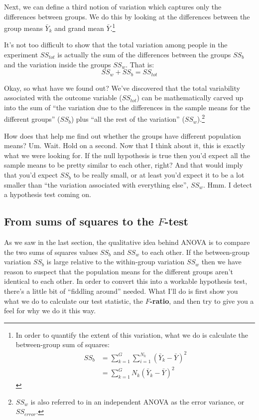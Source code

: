 \documentclass[
  a4paper,
]{book}
\begin{document}
Next, we can define a third notion of variation which captures only the
differences between groups. We do this by looking at the differences
between the group means \(\bar{Y}_k\) and grand mean
\(\bar{Y}\).\footnote{In order to quantify the extent of this variation,
  what we do is calculate the between-group sum of squares:
  \[\begin{aligned} SS_{b} &= \sum_{k=1}^{G} \sum_{i=1}^{N_k} ( \bar{Y}_{k} - \bar{Y} )^2 \\ &= \sum_{k=1}^{G} N_k ( \bar{Y}_{k} - \bar{Y} )^2 \end{aligned}\]}

It's not too difficult to show that the total variation among people in
the experiment \(SS_{tot}\) is actually the sum of the differences
between the groups \(SS_b\) and the variation inside the groups
\(SS_w\). That is: \[SS_w+SS_b=SS_{tot}\]

Okay, so what have we found out? We've discovered that the total
variability associated with the outcome variable (\(SS_{tot}\)) can be
mathematically carved up into the sum of ``the variation due to the
differences in the sample means for the different groups'' (\(SS_b\))
plus ``all the rest of the variation'' (\(SS_w\)).\footnote{\(SS_w\) is
  also referred to in an independent ANOVA as the error variance, or
  \(SS_{error}\).}

How does that help me find out whether the groups have different
population means? Um. Wait. Hold on a second. Now that I think about it,
this is exactly what we were looking for. If the null hypothesis is true
then you'd expect all the sample means to be pretty similar to each
other, right? And that would imply that you'd expect \(SS_b\) to be
really small, or at least you'd expect it to be a lot smaller than ``the
variation associated with everything else'', \(SS_w\). Hmm. I detect a
hypothesis test coming on.

\hypertarget{from-sums-of-squares-to-the-f-test}{%
\subsection{\texorpdfstring{From sums of squares to the
\(F\)-test}{From sums of squares to the F-test}}\label{from-sums-of-squares-to-the-f-test}}

As we saw in the last section, the qualitative idea behind ANOVA is to
compare the two sums of squares values \(SS_b\) and \(SS_w\) to each
other. If the between-group variation \(SS_b\) is large relative to the
within-group variation \(SS_w\) then we have reason to suspect that the
population means for the different groups aren't identical to each
other. In order to convert this into a workable hypothesis test, there's
a little bit of ``fiddling around'' needed. What I'll do is first show
you what we do to calculate our test statistic, the
\textbf{\(F\)-ratio}, and then try to give you a feel for why we do it
this way.
\end{document}
